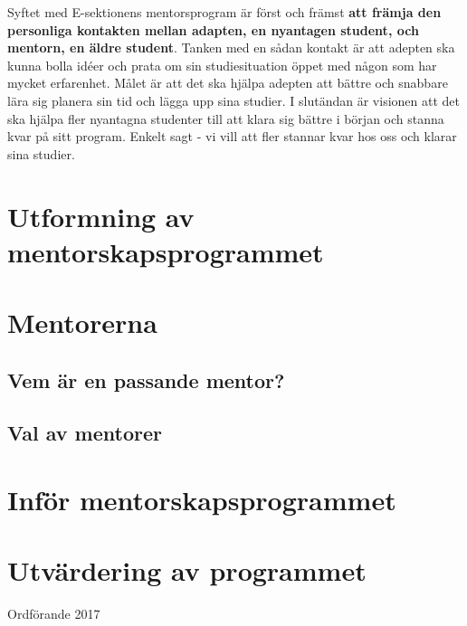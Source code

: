 \documentclass[10pt]{article}
\begin{document}
    Syftet med E-sektionens mentorsprogram är först och främst \textbf{att främja den personliga kontakten mellan adapten, en nyantagen student, och mentorn, en äldre student}.
    Tanken med en sådan kontakt är att adepten ska kunna bolla idéer och prata om sin studiesituation öppet med någon som har mycket erfarenhet.
    Målet är att det ska hjälpa adepten att bättre och snabbare lära sig planera sin tid och lägga upp sina studier.
    I slutändan är visionen att det ska hjälpa fler nyantagna studenter till att klara sig bättre i början och stanna kvar på sitt program.
    Enkelt sagt - vi vill att fler stannar kvar hos oss och klarar sina studier.

    \newpage

    \section*{Utformning av mentorskapsprogrammet}

    \section*{Mentorerna}

    \subsection*{Vem är en passande mentor?}

    \subsection*{Val av mentorer}


    \section*{Inför mentorskapsprogrammet}

    \section*{Utvärdering av programmet}

    \begin{signatures}{1}
        \signature{Erik Månsson}{Ordförande 2017}
    \end{signatures}
\end{document}
